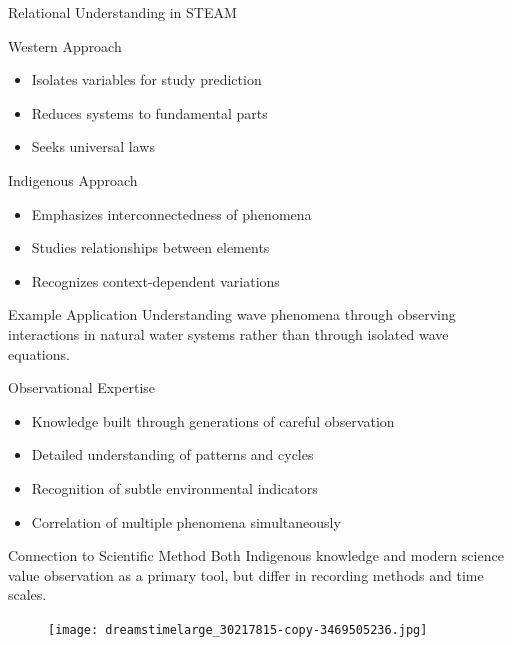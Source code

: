 \documentclass{beamer}
\begin{document}
\begin{frame}{Relational Understanding in STEAM}
    \begin{block}{Western Approach}
        \begin{itemize}
            \item Isolates variables for study prediction
            \item Reduces systems to fundamental parts
            \item Seeks universal laws
        \end{itemize}
    \end{block}
    
    \begin{block}{Indigenous Approach}
        \begin{itemize}
            \item Emphasizes interconnectedness of phenomena
            \item Studies relationships between elements
            \item Recognizes context-dependent variations
        \end{itemize}
    \end{block}
    
    \begin{exampleblock}{Example Application}
        Understanding wave phenomena through observing interactions in natural water systems rather than through isolated wave equations.
    \end{exampleblock}
\end{frame}

\begin{frame}{Observational Expertise}
    \begin{itemize}
        \item Knowledge built through generations of careful observation
        \item Detailed understanding of patterns and cycles
        \item Recognition of subtle environmental indicators
        \item Correlation of multiple phenomena simultaneously
    \end{itemize}
    
    \begin{alertblock}{Connection to Scientific Method}
        Both Indigenous knowledge and modern science value observation as a primary tool, but differ in recording methods and time scales.
    \end{alertblock}
    
   \begin{figure}
       \centering
       \texttt{[image: dreamstimelarge\_30217815-copy-3469505236.jpg]}
   \end{figure}
\end{frame}
\end{document}
